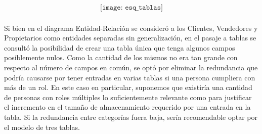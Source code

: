 \documentclass{article}
\begin{document}
\begin{align*}
\texttt{[image: esq\_tablas]}
\end{align*}

\paragraph{}
Si bien en el diagrama Entidad-Relaci\'on se consider\'o a los Clientes, Vendedores y Propietarios como entidades separadas sin generalizaci\'on, en el pasaje a tablas se consult\'o la posibilidad de crear una tabla \'unica que tenga algunos campos posiblemente nulos. Como la cantidad de los mismos no era tan grande con respecto al n\'umero de campos en com\'un, se opt\'o por eliminar la redundancia que podr\'ia causarse por tener entradas en varias tablas si una persona cumpliera con m\'as de un rol.
En este caso en particular, suponemos que existir\'ia una cantidad de personas con roles m\'ultiples lo suficientemente relevante como para justificar el incremento en el tamaño de almacenamiento requerido por una entrada en la tabla. Si la redundancia entre categor\'ias fuera baja, ser\'ia recomendable optar por el modelo de tres tablas.

\newpage

\nocite{*}


\end{document}
